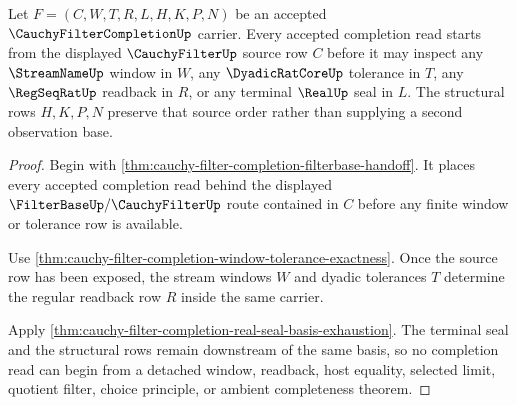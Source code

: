 \begin{theorem}
\label{thm:cauchy-filter-completion-observation-base}
Let $F=(C,W,T,R,L,H,K,P,N)$ be an accepted $\CauchyFilterCompletionUp$ carrier. Every accepted completion read starts from the displayed $\CauchyFilterUp$ source row $C$ before it may inspect any $\StreamNameUp$ window in $W$, any $\DyadicRatCoreUp$ tolerance in $T$, any $\RegSeqRatUp$ readback in $R$, or any terminal $\RealUp$ seal in $L$. The structural rows $H,K,P,N$ preserve that source order rather than supplying a second observation base.
\end{theorem}
\begin{proof}
Begin with \autoref{thm:cauchy-filter-completion-filterbase-handoff}. It places every accepted completion read behind the displayed $\FilterBaseUp/\CauchyFilterUp$ route contained in $C$ before any finite window or tolerance row is available.

Use \autoref{thm:cauchy-filter-completion-window-tolerance-exactness}. Once the source row has been exposed, the stream windows $W$ and dyadic tolerances $T$ determine the regular readback row $R$ inside the same carrier.

Apply \autoref{thm:cauchy-filter-completion-real-seal-basis-exhaustion}. The terminal seal and the structural rows remain downstream of the same basis, so no completion read can begin from a detached window, readback, host equality, selected limit, quotient filter, choice principle, or ambient completeness theorem.
\end{proof}

